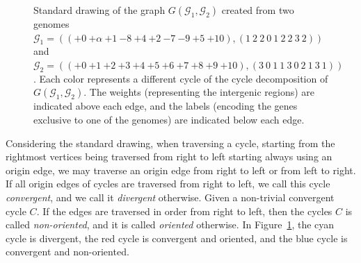 \documentclass[12pt]{article}
\begin{document}
\begin{figure}[tb]
{
}
\caption{Standard drawing of the graph $G(\mathcal{G}_1,\mathcal{G}_2)$ created from two genomes $\mathcal{G}_1 = (({+0}~{+\alpha}~{+1}~{-8}~{+4}~{+2}~{-7}~{-9}~{+5}~{+10}), ({1}~{2}~{2}~{0}~{1}~{2}~{2}~{3}~{2}))$ and $\mathcal{G}_2 = (({+0}~{+1}~{+2}~{+3}~{+4}~{+5}~{+6}~{+7}~{+8}~{+9}~{+10}), ({3}~{0}~{1}~{1}~{3}~{0}~{2}~{1}~{3}~{1}))$. Each color represents a different cycle of the cycle decomposition of $G(\mathcal{G}_1,\mathcal{G}_2)$. The weights (representing the intergenic regions) are indicated above each edge, and the labels (encoding the genes exclusive to one of the genomes) are indicated below each edge.}
\label{fig:bg}
\end{figure}


Considering the standard drawing, when traversing a cycle, starting from the rightmost vertices being traversed from right to left starting always using an origin edge, we may traverse an origin edge from right to left or from left to right. If all origin edges of cycles are traversed from right to left, we call this cycle \emph{convergent}, and we call it \emph{divergent} otherwise. Given a non-trivial convergent cycle $C$. If the edges are traversed in order from right to left, then the cycles $C$ is called \emph{non-oriented}, and it is called \emph{oriented} otherwise. In Figure~\ref{fig:bg}, the cyan cycle is divergent, the red cycle is convergent and oriented, and the blue cycle is convergent and non-oriented.
\end{document}
